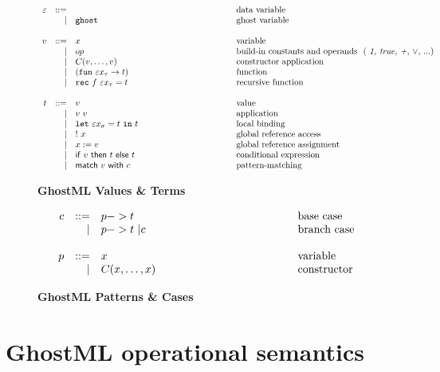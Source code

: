 \begin{small}
\begin{figure}[!h]\vspace*{-0.5cm}
\begin{displaymath}
  \begin{array}{rrl@{\hspace*{4cm} }l}
  \grhead{\varepsilon}{\quad}{data variable}
  \grcase{\texttt{ghost}}{ghost variable} \\
  
  \grhead{v}{x}{variable}
  \grcase{op}{build-in constants and operands \ ( \textit{1, true, +}, $\vee$, ...)}
  \grcase{C(v,\dots, v)}{constructor application}
  \grcase{(\texttt{fun} \ \varepsilon x_{\tau} \rightarrow t)}{function}
  \grcase{ \texttt{rec} \ f \ \varepsilon x_{\tau}   =  t}{recursive function} \\

  \grhead{t}{v}{value}
  \grcase{v ~ v}{application}
  \grcase{\texttt{let}~\varepsilon x_{\sigma} = t \ \texttt{in} \ t}{local binding}
  \grcase{!~x}{global reference access}
  \grcase{x := v}{global reference assignment}
  \grcase{\mathsf{if}~v~\mathsf{then}~t~\mathsf{else}~t }{conditional expression}
  \grcase{\mathsf{match} ~v ~ \mathsf{with} ~ c	}{pattern-matching}
  \end{array} 
\end{displaymath} \vspace*{-0.5cm}
\caption*{ \textbf{GhostML Values \& Terms} \hfill}
\end{figure}

\begin{figure}[!h]
\begin{displaymath}
  \begin{array}{rrl@{\hspace*{4.5cm}}l}
  \grhead{c}{p -> t}{base case}
  \grcase{p -> t  ~|c}{branch case} \\
  \grhead{p}{x}{variable}
  \grcase{C(x,\dots, x)}{constructor}
  \end{array} 
\end{displaymath} \vspace*{-0.5cm}
\caption*{ \textbf{GhostML Patterns \& Cases} \hfill}
\end{figure}
\end{small}
\newpage

\label{GhostML operational semantics}
\section*{GhostML  operational semantics}


